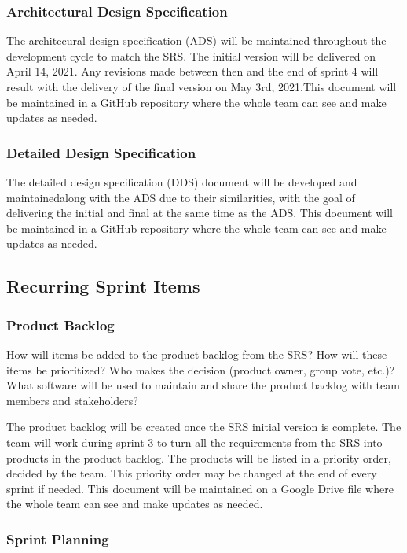 \subsubsection{Architectural Design Specification}

The architecural design specification (ADS) will be maintained throughout the development cycle to match the SRS. The initial version will be delivered on April 14, 2021. Any revisions made between then and the end of sprint 4 will result with the delivery of the final version on May 3rd, 2021.This document will be maintained in a GitHub repository where the whole team can see and make updates as needed.

\subsubsection{Detailed Design Specification}

The detailed design specification (DDS) document will be developed and maintainedalong with the ADS due to their similarities, with the goal of delivering the initial and final at the same time as the ADS. This document will be maintained in a GitHub repository where the whole team can see and make updates as needed.
\subsection{Recurring Sprint Items}

\subsubsection{Product Backlog}
How will items be added to the product backlog from the SRS? How will these items be prioritized? Who makes the decision (product owner, group vote, etc.)? What software will be used to maintain and share the product backlog with team members and stakeholders?

The product backlog will be created once the SRS initial version is complete. The team will work during sprint 3 to turn all the requirements from the SRS into products in the product backlog. The products will be listed in a priority order, decided by the team. This priority order may be changed at the end of every sprint if needed. This document will be maintained on a Google Drive file where the whole team can see and make updates as needed.

\subsubsection{Sprint Planning}

